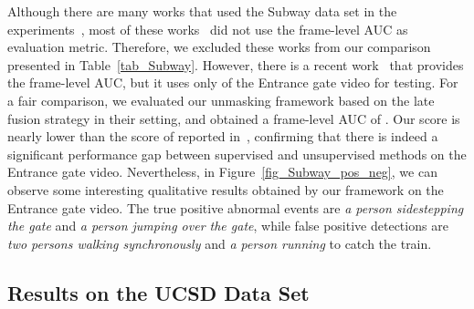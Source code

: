 \documentclass[10pt,twocolumn,letterpaper]{article}
\begin{document}
Although there are many works that used the Subway data set in the experiments~\cite{Cheng-CVPR-2015,Cong-CVPR-2011,Dutta-AAAI-2015,Lu-ICCV-2013,Zhang-PR-2016}, most of these works~\cite{Dutta-AAAI-2015,Lu-ICCV-2013,Zhang-PR-2016} did not use the frame-level AUC as evaluation metric. Therefore, we excluded these works from our comparison presented in Table~\ref{tab_Subway}. However, there is a recent work~\cite{Cheng-CVPR-2015} that provides the frame-level AUC, but it uses only  of the Entrance gate video for testing. For a fair comparison, we evaluated our unmasking framework based on the late fusion strategy in their setting, and obtained a frame-level AUC of . Our score is nearly  lower than the score of  reported in~\cite{Cheng-CVPR-2015}, confirming that there is indeed a significant performance gap between supervised and unsupervised methods on the Entrance gate video. Nevertheless, in Figure~\ref{fig_Subway_pos_neg}, we can observe some interesting qualitative results obtained by our framework on the Entrance gate video. The true positive abnormal events are \emph{a person sidestepping the gate} and \emph{a person jumping over the gate}, while false positive detections are \emph{two persons walking synchronously} and \emph{a person running} to catch the train. 

\subsection{Results on the UCSD Data Set}
\end{document}

